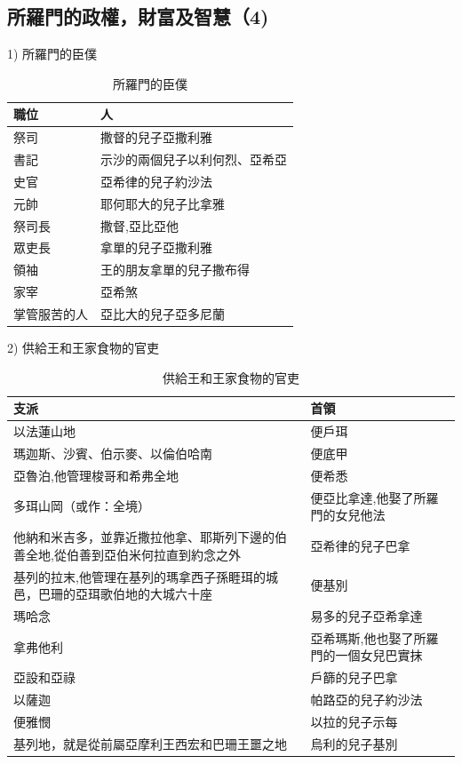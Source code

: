 \documentclass{ctexart}
\begin{document}
\subsection{所羅門的政權，財富及智慧（4)}

\begin{description}
\item  1) 所羅門的臣僕
\begin{table}[!hbp]
\centering
\begin{tabular}{|p{3cm}|p{6cm}|}
\hline
\hline
職位   &  人 \\\hline\hline
祭司&撒督的兒子亞撒利雅\\\hline
 書記              &示沙的兩個兒子以利何烈、亞希亞\\\hline
  史官                     &亞希律的兒子約沙法\\\hline
 元帥&耶何耶大的兒子比拿雅\\\hline
 祭司長  & 撒督,亞比亞他\\\hline
眾吏長  & 拿單的兒子亞撒利雅\\\hline
  領袖 & 王的朋友拿單的兒子撒布得\\\hline
   家宰  &亞希煞 \\\hline
 掌管服苦的人 &亞比大的兒子亞多尼蘭 \\\hline
 \end{tabular}
\caption{所羅門的臣僕}
\end{table}
 
\item  2) 供給王和王家食物的官吏 
 \begin{table}[!hbp]
\centering
\begin{tabular}{|p{8cm}|p{8cm}|}
\hline
\hline
支派   & 首領 \\\hline\hline
 以法蓮山地  &便戶珥 \\\hline 
  瑪迦斯、沙賓、伯示麥、以倫伯哈南  &便底甲 \\\hline
 亞魯泊,他管理梭哥和希弗全地 & 便希悉\\\hline
 多珥山岡（或作：全境）  & 便亞比拿達,他娶了所羅門的女兒他法\\\hline  
  他納和米吉多，並靠近撒拉他拿、耶斯列下邊的伯善全地,從伯善到亞伯米何拉直到約念之外   &亞希律的兒子巴拿 \\\hline
基列的拉末,他管理在基列的瑪拿西子孫睚珥的城邑，巴珊的亞珥歌伯地的大城六十座  & 便基別\\\hline
  瑪哈念 &易多的兒子亞希拿達 \\\hline 
  拿弗他利    & 亞希瑪斯,他也娶了所羅門的一個女兒巴實抹\\\hline 
  亞設和亞祿       & 戶篩的兒子巴拿\\\hline 
     以薩迦       &帕路亞的兒子約沙法 \\\hline 
     便雅憫          & 以拉的兒子示每\\\hline 
       基列地，就是從前屬亞摩利王西宏和巴珊王噩之地           &烏利的兒子基別 \\\hline 
\end{tabular}
\caption{供給王和王家食物的官吏}
\end{table}


\end{description}
\end{document}
